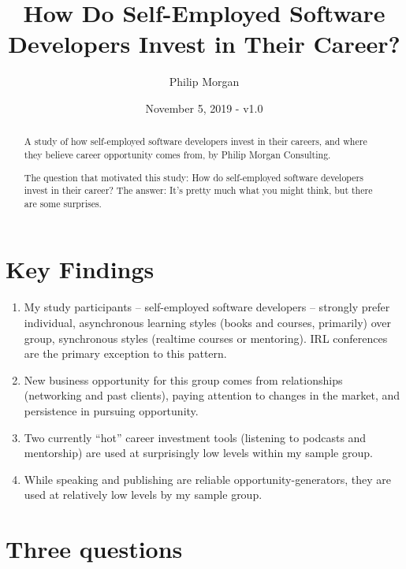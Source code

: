 \documentclass[13pt,]{tufte-handout}
\title{How Do Self-Employed Software Developers Invest in Their Career?}
\author{Philip Morgan}
\date{November 5, 2019 - v1.0}
\providecommand{\tightlist}{%
  \setlength{\itemsep}{0pt}\setlength{\parskip}{0pt}}
\begin{document}
\maketitle

\begin{abstract}
\noindent A study of how self-employed software developers invest in their
careers, and where they believe career opportunity comes from, by Philip
Morgan Consulting.

The question that motivated this study: How do self-employed software
developers invest in their career? The answer: It's pretty much what you
might think, but there are some surprises.
\end{abstract}


{
\hypersetup{linkcolor=black}
\setcounter{tocdepth}{2}
\tableofcontents
}

\newpage

\hypertarget{key-findings}{%
\section{Key Findings}\label{key-findings}}

\begin{enumerate}
\def\labelenumi{\arabic{enumi}.}
\tightlist
\item
  My study participants -- self-employed software developers -- strongly
  prefer individual, asynchronous learning styles (books and courses,
  primarily) over group, synchronous styles (realtime courses or
  mentoring). IRL conferences are the primary exception to this pattern.
\item
  New business opportunity for this group comes from relationships
  (networking and past clients), paying attention to changes in the
  market, and persistence in pursuing opportunity.
\item
  Two currently ``hot'' career investment tools (listening to podcasts
  and mentorship) are used at surprisingly low levels within my sample
  group.
\item
  While speaking and publishing are reliable opportunity-generators,
  they are used at relatively low levels by my sample group.
\end{enumerate}

\hypertarget{three-questions}{%
\section{Three questions}\label{three-questions}}
\end{document}
